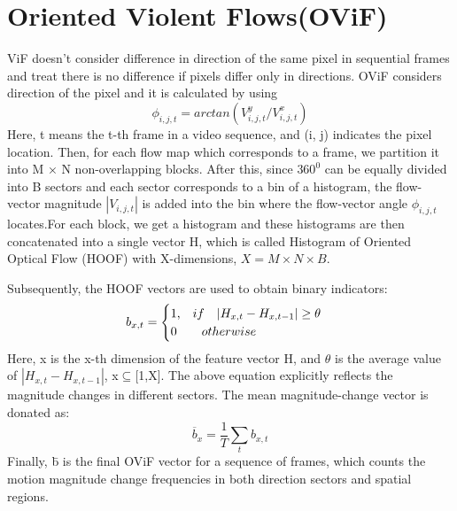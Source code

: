 \section{Oriented Violent Flows(OViF)}
ViF\cite{hassner} doesn't consider difference in direction of the same pixel in sequential frames and treat there is no difference if pixels differ only in directions. OViF\cite{ovif} considers direction of the pixel and it is calculated by using
\begin{equation}
\phi_{i,j,t} = arctan(V^y_{i,j,t}/V^x_{i,j,t}) 
\end{equation}
Here, t means the t-th frame in a video sequence, and (i, j) indicates the pixel location. Then, for each flow map which corresponds to a frame, we partition it into M × N non-overlapping blocks. After this, since $360^0$ can be equally divided into B sectors and each sector corresponds to a bin of a histogram, the flow-vector magnitude $|V_{i,j,t}|$ is added into the bin where the flow-vector angle $\phi_{i,j,t}$ locates.For each block, we get a histogram and these histograms are then concatenated into a single vector H, which is called Histogram of Oriented Optical Flow (HOOF)\cite{ovif} with X-dimensions, $X = M \times N \times B$.
\par
Subsequently, the HOOF vectors are used to obtain binary indicators:
\begin{equation}
b_{x,t} = \begin{cases}
\text {1,\quad}if\quad |H_{x,t} - H_{x,t-1}| \geq \theta\\
\text {0\quad}   \quad otherwise
\end{cases}
\end{equation}
Here, x is the x-th dimension of the feature vector H, and $\theta$ is the average value of $|H_{x,t}-H_{x,t-1}|$, x$\subseteq$[1,X]. The above equation explicitly reflects the magnitude changes in different sectors. The mean magnitude-change vector is donated as:
\begin{equation}
\overline b_{x} = \frac{1}{T}\sum_{t}b_{x,t}
\end{equation}
Finally, b̄ is the final OViF vector for a sequence of frames, which counts the motion magnitude change frequencies in both direction sectors and spatial regions.
